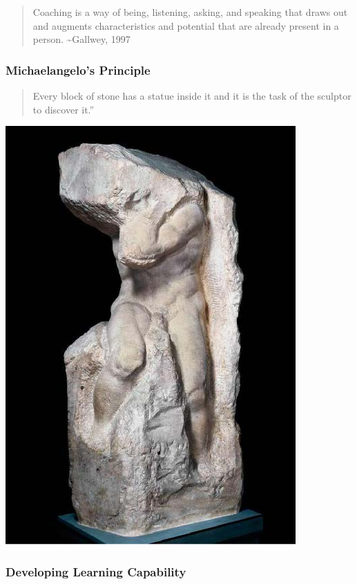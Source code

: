 \documentclass[
]{book}
\begin{document}
\begin{quote}
Coaching is a way of being, listening, asking, and speaking that draws out and augments characteristics and potential that are already present in a person. \textasciitilde Gallwey, 1997
\end{quote}

\hypertarget{michaelangelos-principle}{%
\subsubsection*{Michaelangelo's Principle}\label{michaelangelos-principle}}

\begin{quote}
Every block of stone has a statue inside it and it is the task of the sculptor to discover it.''
\end{quote}

\includegraphics{assets/presentations/coaching/mike.jpg}

\hypertarget{developing-learning-capability}{%
\subsubsection*{Developing Learning Capability}\label{developing-learning-capability}}
\end{document}

